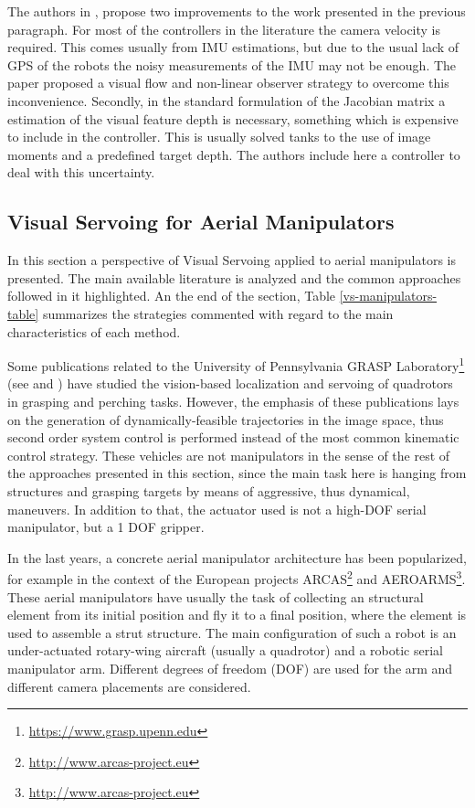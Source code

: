  
 The authors in \cite{asl_vision-based_2015}, propose two improvements to the work presented in the previous paragraph. For most of the controllers in the literature the camera velocity is required. This comes usually from IMU estimations, but due to the usual lack of GPS of the robots the noisy measurements of the IMU may not be enough. The paper proposed a visual flow and non-linear observer strategy to overcome this inconvenience. Secondly, in the standard formulation of the Jacobian matrix a estimation of the visual feature depth is necessary, something which is expensive to include in the controller. This is usually solved tanks to the use of image moments and a predefined target depth. The authors include here a controller to deal with this uncertainty. 
 
   

\subsection{Visual Servoing for Aerial Manipulators}

In this section a perspective of Visual Servoing applied to aerial manipulators is presented. The main available literature is analyzed and the common approaches followed in it highlighted. An the end of the section, Table \ref{vs-manipulators-table} summarizes the strategies commented with regard to the main characteristics of each method. 


Some publications related to the University of Pennsylvania GRASP Laboratory\footnote{\url{https://www.grasp.upenn.edu}}  (see \cite{thomas_toward_2014} and \cite{thomas_visual_2016}) have studied the vision-based localization and servoing of quadrotors in grasping and perching tasks. However, the emphasis of these publications lays on the generation of dynamically-feasible trajectories in the image space, thus second order system control is performed instead of the most common kinematic control strategy. These vehicles are not manipulators in the sense of the rest of the approaches presented in this section, since the main task here is hanging from structures and grasping targets by means of aggressive, thus dynamical, maneuvers. In addition to that, the actuator used is not a high-DOF serial manipulator, but a 1 DOF gripper.  

In the last years, a concrete aerial manipulator architecture has been popularized, for example in the context of the European projects ARCAS\footnote{\url{http://www.arcas-project.eu}} and AEROARMS\footnote{\url{http://www.arcas-project.eu}}. These aerial manipulators have usually the task of collecting an structural element from its initial position and fly it to a final position, where the element is used to assemble a strut structure. The main configuration of such a robot is an under-actuated rotary-wing aircraft (usually a quadrotor) and a robotic serial manipulator arm. Different degrees of freedom (DOF) are used for the arm and different camera placements are considered.
 
